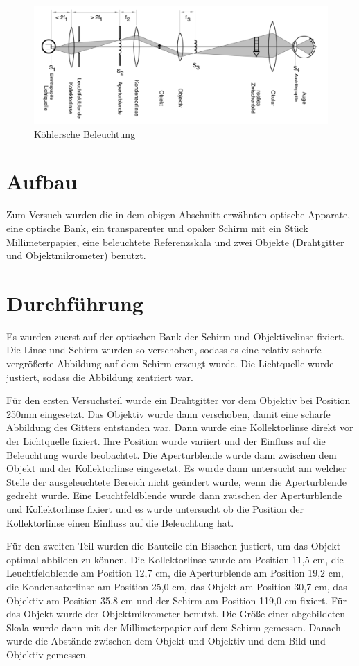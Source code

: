 \documentclass[11pt,a4paper]{article}
\begin{document}
\begin{figure}
	\centering
	\includegraphics[width=\linewidth]{Abb3}
	\caption{Köhlersche Beleuchtung}
\end{figure}

\section{Aufbau}
Zum Versuch wurden die in dem obigen Abschnitt erwähnten optische Apparate, eine optische Bank, ein transparenter und opaker Schirm mit ein Stück Millimeterpapier, eine beleuchtete Referenzskala und zwei Objekte (Drahtgitter und Objektmikrometer) benutzt. 

\section{Durchführung}
Es wurden zuerst auf der optischen Bank der Schirm und Objektivelinse fixiert. Die Linse und Schirm wurden so verschoben, sodass es eine relativ scharfe vergrößerte Abbildung auf dem Schirm erzeugt wurde. Die Lichtquelle wurde justiert, sodass die Abbildung zentriert war.  

Für den ersten Versuchsteil wurde ein Drahtgitter vor dem Objektiv bei Position 250mm eingesetzt. Das Objektiv wurde dann verschoben, damit eine scharfe Abbildung des Gitters entstanden war. Dann wurde eine Kollektorlinse direkt vor der Lichtquelle fixiert. Ihre Position wurde variiert und der Einfluss auf die Beleuchtung wurde beobachtet. Die Aperturblende wurde dann zwischen dem Objekt und der Kollektorlinse eingesetzt. Es wurde dann untersucht am welcher Stelle der ausgeleuchtete Bereich nicht geändert wurde, wenn die Aperturblende gedreht wurde. Eine Leuchtfeldblende wurde dann zwischen der Aperturblende und Kollektorlinse fixiert und es wurde untersucht ob die Position der Kollektorlinse einen Einfluss auf die Beleuchtung hat. 

Für den zweiten Teil wurden die Bauteile ein Bisschen justiert, um das Objekt optimal abbilden zu können. Die Kollektorlinse wurde am Position 11,5 cm, die Leuchtfeldblende am Position 12,7 cm, die Aperturblende am Position 19,2 cm, die Kondensatorlinse am Position 25,0 cm, das Objekt am Position 30,7 cm, das Objektiv am Position 35,8 cm und der Schirm am Position 119,0 cm fixiert. Für das Objekt wurde der Objektmikrometer benutzt. Die Größe einer abgebildeten Skala wurde dann mit der Millimeterpapier auf dem Schirm gemessen. Danach wurde die Abstände zwischen dem Objekt und Objektiv und dem Bild und Objektiv gemessen. 
\end{document}
